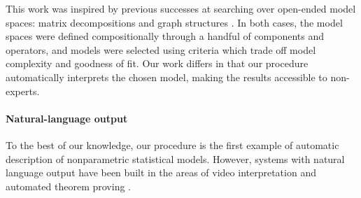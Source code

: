 \documentclass[letterpaper]{article}
\def\eg{e.g.\ }
\newcommand{\procedurename}{ABCD}
\renewcommand{\fTBD}[1]{}
\renewcommand{\NA}[1]{#1}  %
\begin{document}
This work was inspired by previous successes at searching over open-ended model spaces: matrix decompositions \citep{grosse2012exploiting} and graph structures \citep{kemp2008discovery}.
In both cases, the model spaces were defined compositionally through a handful of components and operators, and models were selected using criteria which trade off model complexity and goodness of fit.
Our work differs in that our procedure automatically interprets the chosen model, making the results accessible to non-experts.




\paragraph{Natural-language output}
To the best of our knowledge, our procedure is the first example of automatic description of nonparametric statistical models.
However, systems with natural language output have been built in the areas of video interpretation \citep{barbu2012video} and automated theorem proving \citep{GanesalingamG13}.
\end{document}
